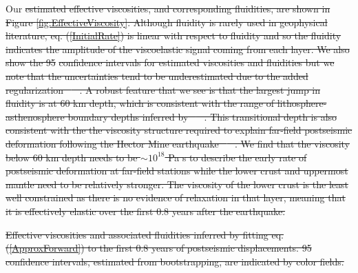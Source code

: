 \documentclass[draft,linenumbers]{AGUJournal}
\providecommand{\DIFdel}[1]{{\protect\color{red}\sout{#1}}}                      %
\providecommand{\DIFdelbegin}{} %
\begin{document}
Our \DIFdelbegin \DIFdel{estimated effective viscosities, and corresponding fluidities, are shown in Figure \ref{fig:EffectiveViscosity}.  Although fluidity is rarely used in geophysical literature, eq. (\ref{InitialRate}) is linear with respect to fluidity and so the fluidity indicates the amplitude of the viscoelastic signal coming from each layer.  We also show the 95}%
\DIFdel{confidence intervals for estimated viscosities and fluidities but we note that the uncertainties tend to be underestimated due to the added regularization \mbox{%
\citep{Aster2011}
}%
.  A robust feature that we see is that the largest jump in fluidity is at 60 km depth, which is consistent with the range of lithosphere-asthenosphere boundary depths inferred by \mbox{%
\citet{Lekic2011}
}%
. This transitional depth is also consistent with the the viscosity structure required to explain far-field postseismic deformation following the Hector Mine earthquake \mbox{%
\citep{Freed2007a}
}%
. We find that the viscosity below 60 km depth needs to be ${\sim}10^{18}$ Pa s to describe the early rate of postseismic deformation at far-field stations while the lower crust and uppermost mantle need to be relatively stronger.  The viscosity of the lower crust is the least well constrained as there is no evidence of relaxation in that layer, meaning that it is effectively elastic over the first 0.8 years after the earthquake.  
}%

{%
\DIFdel{Effective viscosities and associated fluidities inferred by fitting eq. (\ref{ApproxForward}) to the first 0.8 years of postseismic displacements. 95}%
\DIFdel{confidence intervals, estimated from bootstrapping, are indicated by color fields.}}
\end{document}
